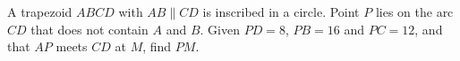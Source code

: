 A trapezoid $ABCD$ with $AB\parallel CD$ is inscribed in a circle. Point $P$ lies on the arc $CD$ that does not contain $A$ and $B$. Given $PD=8$, $PB=16$ and $PC=12$, and that $AP$ meets $CD$ at $M$, find $PM$.
